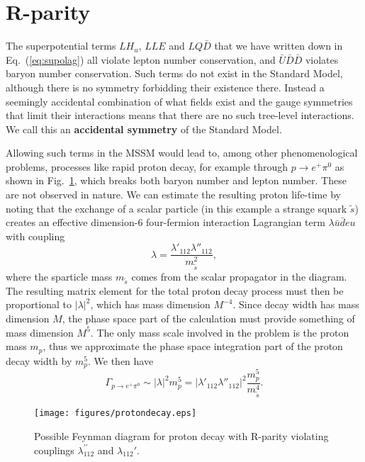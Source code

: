 \documentclass[notes.tex]{subfiles}
\begin{document}
\section{R-parity}
The superpotential terms $LH_u$, $LLE$ and $LQ\bar{D}$ that we have written down in Eq.~(\ref{eq:supolag}) all violate lepton number conservation, and $\bar{U}\bar{D}\bar{D}$ violates baryon number conservation. Such terms do not exist in the Standard Model, although there is no symmetry forbidding their existence there. Instead a seemingly accidental combination of what fields exist and the gauge symmetries that limit their interactions means that there are no such tree-level interactions. We call this an {\bf accidental symmetry} of the Standard Model.  

Allowing such terms in the MSSM would lead to, among other phenomenological problems, processes like rapid proton decay, for example through $p\to e^+ \pi^0$ as shown in Fig.~\ref{fig:proton}, which breaks both baryon number and lepton number. These are not observed in nature. We can estimate the resulting proton life-time by noting that the exchange of a scalar particle (in this example a strange squark $\tilde s$) creates an effective dimension-6 four-fermion interaction Lagrangian term $\lambda\bar u \bar deu$ with coupling 
\begin{equation}
\lambda = \frac{\lambda'_{112}\lambda''_{112}}{m_{\tilde{s}}^2},
\end{equation}
where the sparticle mass $m_{\tilde s}$ comes from the scalar propagator in the diagram. The resulting matrix element for the total proton decay process must then be proportional to $|\lambda|^2$, which has mass dimension $M^{-4}$. Since decay width has mass dimension $M$, the phase space part of the calculation must provide something of mass dimension $M^5$.
The only mass scale involved in the problem is the proton mass $m_p$, thus we approximate the phase space integration part of the proton decay width by $m_p^5$. We then have
\begin{equation}
\Gamma_{p\to e^+ \pi^0} \sim |\lambda|^2 m_p^5 = |\lambda'_{112}\lambda''_{112}|^2\frac{m_p^5}{m_{\tilde{s}}^4}.
\end{equation}

\begin{figure}[h]
\begin{center}
\texttt{[image: figures/protondecay.eps]}
\caption{Possible Feynman diagram for proton decay with R-parity violating couplings $\lambda_{112}^{\prime\prime}$ and $\lambda_{112}'$.\label{fig:proton}}
\end{center}
\end{figure}
\end{document}
